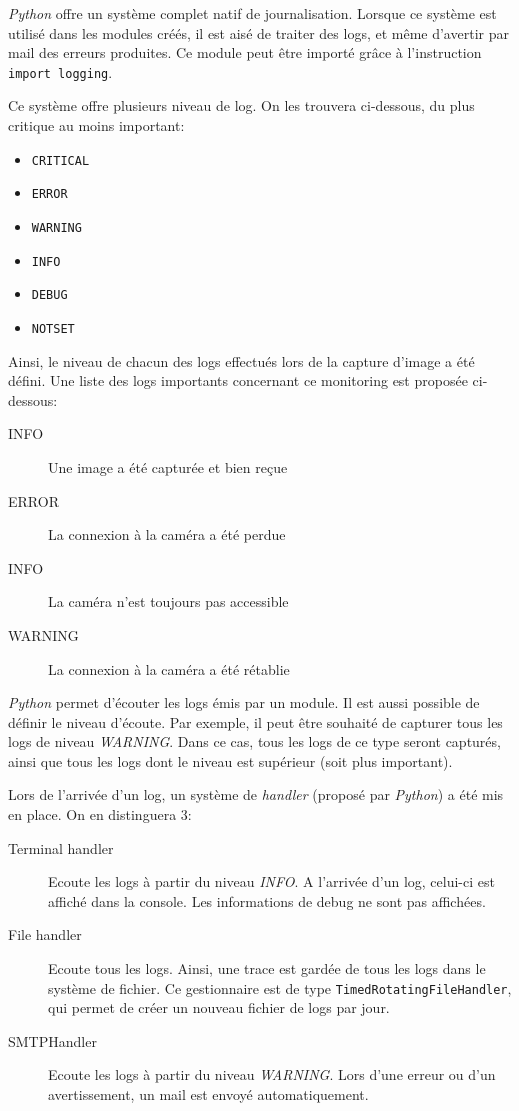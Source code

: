 \textit{Python} offre un système complet natif de journalisation. Lorsque ce système est utilisé dans les modules créés, il est aisé de traiter des logs, et même d'avertir par mail des erreurs produites. Ce module peut être importé grâce à l'instruction \lstinline[columns=fixed]{import logging}.

Ce système offre plusieurs niveau de log. On les trouvera ci-dessous, du plus critique au moins important\autocite{doc:log}:
\begin{itemize}
    \item \lstinline[columns=fixed]{CRITICAL}
    \item \lstinline[columns=fixed]{ERROR}
    \item \lstinline[columns=fixed]{WARNING}
    \item \lstinline[columns=fixed]{INFO}
    \item \lstinline[columns=fixed]{DEBUG}
    \item \lstinline[columns=fixed]{NOTSET}
\end{itemize}

Ainsi, le niveau de chacun des logs effectués lors de la capture d'image a été défini. Une liste des logs importants concernant ce monitoring est proposée ci-dessous:
\begin{description}
    \item[INFO] Une image a été capturée et bien reçue
    \item[ERROR] La connexion à la caméra a été perdue
    \item[INFO] La caméra n'est toujours pas accessible
    \item[WARNING] La connexion à la caméra a été rétablie
\end{description}

\textit{Python} permet d'écouter les logs émis par un module. Il est aussi possible de définir le niveau d'écoute. Par exemple, il peut être souhaité de capturer tous les logs de niveau \textit{WARNING}. Dans ce cas, tous les logs de ce type seront capturés, ainsi que tous les logs dont le niveau est supérieur (soit plus important). 

Lors de l'arrivée d'un log, un système de \textit{handler} (proposé par \textit{Python}) a été mis en place. On en distinguera 3:
\begin{description}
    \item[Terminal handler] Ecoute les logs à partir du niveau \textit{INFO}. A l'arrivée d'un log, celui-ci est affiché dans la console. Les informations de debug ne sont pas affichées.
    \item[File handler] Ecoute tous les logs. Ainsi, une trace est gardée de tous les logs dans le système de fichier. Ce gestionnaire est de type \lstinline[columns=fixed]{TimedRotatingFileHandler}, qui permet de créer un nouveau fichier de logs par jour. 
    \item[SMTPHandler] Ecoute les logs à partir du niveau \textit{WARNING}. Lors d'une erreur ou d'un avertissement, un mail est envoyé automatiquement.
\end{description}

